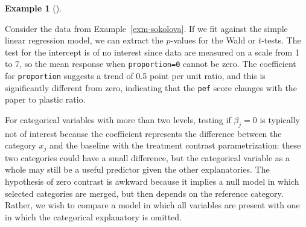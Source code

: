 \documentclass[
  11pt,
  letterpaper,
]{scrbook}
\newenvironment{Shaded}{\begin{snugshade}}{\end{snugshade}}
\newcommand{\CommentTok}[1]{\textcolor[rgb]{0.37,0.37,0.37}{#1}}
\newcommand{\FunctionTok}[1]{\textcolor[rgb]{0.28,0.35,0.67}{#1}}
\newcommand{\NormalTok}[1]{\textcolor[rgb]{0.00,0.23,0.31}{#1}}
\newcommand{\SpecialCharTok}[1]{\textcolor[rgb]{0.37,0.37,0.37}{#1}}
\theoremstyle{plain}
\theoremstyle{plain}
\theoremstyle{definition}
\newtheorem{example}{Example}[chapter]
\theoremstyle{definition}
\theoremstyle{remark}
\begin{document}
\begin{example}[]\protect\hypertarget{exm-sokolova-simple-ttest}{}\label{exm-sokolova-simple-ttest}

Consider the data from Example~\ref{exm-sokolova}. If we fit against the
simple linear regression model, we can extract the \(p\)-values for the
Wald or \(t\)-tests. The test for the intercept is of no interest since
data are measured on a scale from 1 to 7, so the mean response when
\texttt{proportion=0} cannot be zero. The coefficient for
\texttt{proportion} suggests a trend of 0.5 point per unit ratio, and
this is significantly different from zero, indicating that the
\texttt{pef} score changes with the paper to plastic ratio.

\begin{Shaded}
\end{Shaded}

\end{example}

For categorical variables with more than two levels, testing if
\(\beta_j=0\) is typically not of interest because the coefficient
represents the difference between the category \(x_j\) and the baseline
with the treatment contrast parametrization: these two categories could
have a small difference, but the categorical variable as a whole may
still be a useful predictor given the other explanatories. The
hypothesis of zero contrast is awkward because it implies a null model
in which selected categories are merged, but then depends on the
reference category. Rather, we wish to compare a model in which all
variables are present with one in which the categorical explanatory is
omitted.
\end{document}
